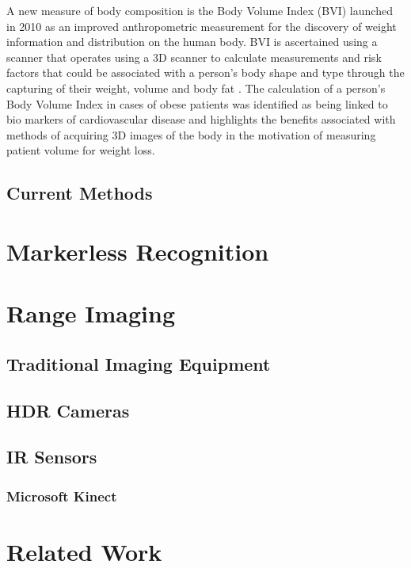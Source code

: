 A new measure of body composition is the Body Volume Index (BVI) launched in 2010 as an improved anthropometric measurement for the discovery of weight information and distribution on the human body. 
BVI is ascertained using a scanner that operates using a 3D scanner to calculate measurements and risk factors that could be associated with a person's body shape and type through the capturing of their weight, volume and body fat \cite{BVIRelease}. 
The calculation of a person's Body Volume Index in cases of obese patients was identified as being linked  to bio markers of cardiovascular disease and highlights the benefits associated with methods of acquiring 3D images of the body in the motivation of measuring patient volume for weight loss.

\subsection{Current Methods}

\section{Markerless Recognition}

\section{Range Imaging}

\subsection{Traditional Imaging Equipment}

\subsection{HDR Cameras}

\subsection{IR Sensors}

\subsubsection{Microsoft Kinect}

\section{Related Work}

